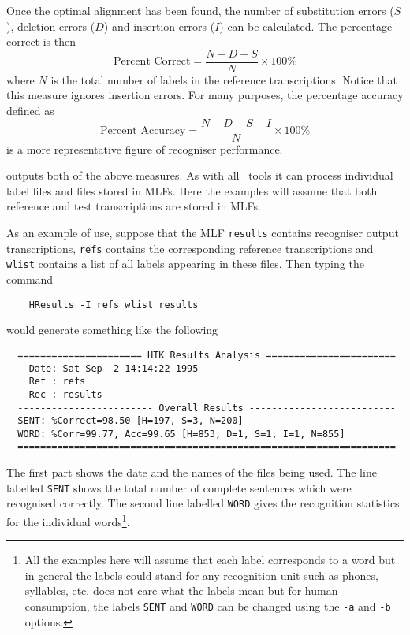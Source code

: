 Once the optimal alignment has been found, the number of substitution
errors ($S$), deletion errors ($D$) and insertion errors ($I$) can be
calculated.  The percentage correct is then
\begin{equation}
    \mbox{Percent Correct} = \frac{N-D-S}{N} \times 100\%
\end{equation}
where $N$ is the total number of labels in the reference transcriptions.
Notice that this measure ignores insertion errors.  For many purposes,
the percentage accuracy defined as
\begin{equation}
    \mbox{Percent Accuracy} = \frac{N-D-S-I}{N} \times 100\%
\end{equation}
is a more representative figure of 
recogniser performance.

 outputs both of the above measures. As with all 
\HTK\ tools it can process individual label files and files stored in MLFs.
Here the examples will assume that both reference and test transcriptions
are stored in MLFs.

As an example of use, suppose that the MLF \texttt{results} contains
recogniser output transcriptions, \texttt{refs} contains
the corresponding reference transcriptions and \texttt{wlist}
contains a list of all labels appearing in these files.  Then typing the command
\begin{verbatim}
    HResults -I refs wlist results
\end{verbatim}
would generate something like the following
\begin{verbatim}
  ====================== HTK Results Analysis =======================
    Date: Sat Sep  2 14:14:22 1995
    Ref : refs
    Rec : results
  ------------------------ Overall Results --------------------------
  SENT: %Correct=98.50 [H=197, S=3, N=200]
  WORD: %Corr=99.77, Acc=99.65 [H=853, D=1, S=1, I=1, N=855]
  ===================================================================
\end{verbatim}
The first part shows the date and the names of the files being used.
The line labelled \texttt{SENT} shows the total number of 
complete sentences which were recognised correctly.  The second line 
labelled \texttt{WORD} 
gives the
recognition statistics for the individual words\footnote{
All the examples here will assume that each label corresponds to a word
but in general the labels could stand for any recognition unit such as
phones, syllables, etc.   does not care what the labels
mean but for human consumption, the labels  \texttt{SENT} 
and \texttt{WORD}  can be changed using the \texttt{-a} and  \texttt{-b} 
options.}.

